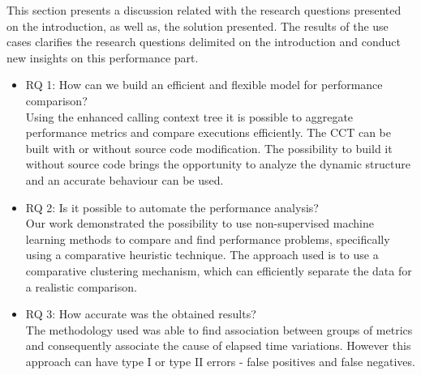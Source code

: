 
This section presents a discussion related with the research questions presented on the introduction, as well as, the solution presented. The results of the use cases clarifies the research questions delimited on the introduction and conduct new insights on this performance part.

\begin{itemize}

\item RQ 1: How can we build an efficient and flexible model for performance comparison?\\
    Using the enhanced calling context tree it is possible to aggregate performance metrics and compare executions efficiently. The CCT can be built with or without source code modification. The possibility to build it without source code brings the opportunity to analyze the dynamic structure and an accurate behaviour can be used.\\
    
\item RQ 2: Is it possible to automate the performance analysis?\\
    Our work demonstrated the possibility to use non-supervised machine learning methods to compare and find performance problems, specifically using a comparative heuristic technique. The approach used is to use a comparative clustering mechanism, which can efficiently separate the data for a realistic comparison.\\
    
\item RQ 3: How accurate was the obtained results?\\
    The methodology used was able to find association between groups of metrics and consequently associate the cause of elapsed time variations. However this approach can have type I or type II errors - false positives and false negatives.
    
\end{itemize}

